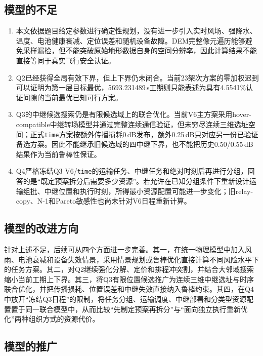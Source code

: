 \documentclass[UTF8,a4paper,12pt]{ctexart}
\begin{document}
\subsection{模型的不足}

\begin{enumerate}
\item 本文依据题目给定参数进行确定性规划，没有进一步引入实时风场、强降水、温度、电池健康衰减、定位误差和随机设备故障。DEM完整像元遍历能够避免采样漏检，但不能突破原始地形数据自身的空间分辨率，因此计算结果不能直接等同于真实飞行安全认证。

\item Q2已经获得全局有效下界，但上下界仍未闭合。当前23架次方案的零加权迟到可以证明为第一层目标最优，5693.231489\,s工期则只能表述为具有4.5541\%认证间隙的当前最优已知可行方案。

\item Q3的中继候选搜索仍是有限候选域上的联合优化。当前V6主方案采用hover-compatible中继转场模型并通过完整连续通信验证，但未穷尽连续三维选址空间；正式\texttt{time}方案按额外传播损耗0\,dB发布，额外0.25\,dB只对应另一份已验证备选方案。因此不能继承旧候选域的四中继下界，也不能把历史0.50/0.55\,dB结果作为当前鲁棒性保证。

\item Q4严格冻结Q3 V6/\texttt{time}的运输任务、中继任务和绝对时刻后再进行分组，回答的是“既定预案拆分后需要多少资源”。若允许在已知分组条件下重新设计运输组批、中继位置和执行时刻，所得最小资源配置可能进一步变化；旧relay-copy、N-1和Pareto敏感性也尚未针对V6日程重新计算。
\end{enumerate}

\subsection{模型的改进方向}

针对上述不足，后续可从四个方面进一步完善。其一，在统一物理模型中加入风雨、电池衰减和设备失效情景，采用情景规划或鲁棒优化直接计算不同风险水平下的任务方案。其二，对Q2继续强化分解、定价和排程冲突割，并结合大邻域搜索缩小当前工期上下界。其三，将Q3有限位置候选推广为连续三维中继选址与时序联合优化，并把传播损耗、位置误差和中继失效直接纳入鲁棒约束。其四，在Q4中放开“冻结Q3日程”的限制，将任务分组、运输调度、中继部署和分类型资源配置置于同一联合模型中，从而比较“先制定预案再拆分”与“面向独立执行重新优化”两种组织方式的资源代价。

\subsection{模型的推广}
\end{document}
